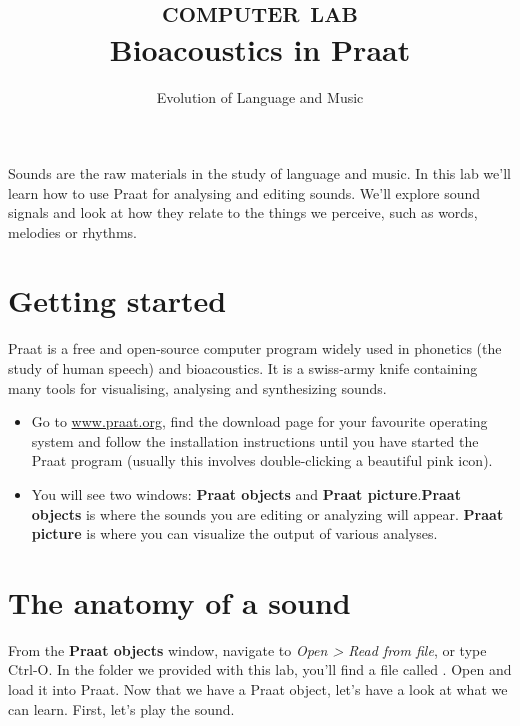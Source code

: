 \documentclass[a4paper, 9pt]{article}
\title{\textsc{computer lab}\\ \textbf{Bioacoustics in Praat}}
\author{Evolution of Language and Music}
\date{}
\begin{document}
\maketitle
{}

\begin{goals}
Sounds are the raw materials in the study of language and music. In this
lab we'll learn how to use Praat for analysing and editing sounds. We'll
explore sound signals and look at how they relate to the things we
perceive, such as words, melodies or rhythms.
\end{goals}

\section{Getting started}\label{getting-started}

Praat is a free and open-source computer program widely used in
phonetics (the study of human speech) and bioacoustics. It is a
swiss-army knife containing many tools for visualising, analysing and
synthesizing sounds.\\

\begin{itemize}
	\item Go to \url{www.praat.org}, find the download page for your favourite operating system and follow the installation instructions until you have started the Praat program (usually this involves double-clicking a beautiful pink icon).
  	\item You will see two windows: \textbf{Praat objects} and \textbf{Praat
  	picture}.\textbf{Praat objects} is where the sounds you are editing or
  	analyzing will appear. \textbf{Praat picture} is where you can visualize
  	the output of various analyses.
\end{itemize}
  

\section{The anatomy of a sound}\label{the-anatomy-of-a-sound}

From the \textbf{Praat objects} window, navigate to \emph{Open > Read from file}, or type Ctrl-O. In the  folder we provided with this lab, you'll find a file called . Open and load it into Praat. Now that we have a Praat object, let's have a look at what we can learn. First, let's play the sound.
\end{document}

